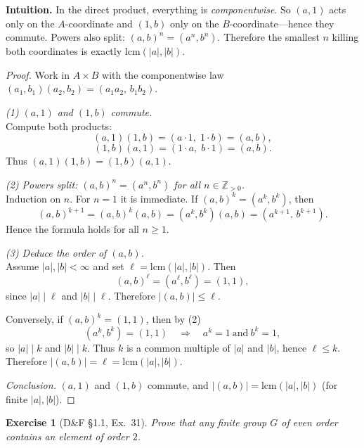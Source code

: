 \documentclass[12pt]{article}
\newtheorem{exercise}[theorem]{Exercise}
\theoremstyle{definition}
\begin{document}
\dotfill

\noindent
\textbf{Intuition.}
In the direct product, everything is \emph{componentwise}. So $(a,1)$ acts only on the $A$-coordinate and $(1,b)$ only on the $B$-coordinate—hence they commute. Powers also split: $(a,b)^n=(a^n,b^n)$. Therefore the smallest $n$ killing both coordinates is exactly $\mathrm{lcm}(|a|,|b|)$.

\dotfill

\begin{proof}
Work in $A\times B$ with the componentwise law $(a_1,b_1)(a_2,b_2)=(a_1a_2,\,b_1b_2)$.

\dotfill

\noindent\emph{(1) $(a,1)$ and $(1,b)$ commute.}\\

\noindent
Compute both products:
\[
(a,1)(1,b)=(a\cdot 1,\;1\cdot b)=(a,b),
\]
\[
(1,b)(a,1)=(1\cdot a,\;b\cdot 1)=(a,b).
\]
Thus $(a,1)(1,b)=(1,b)(a,1)$.

\dotfill

\noindent\emph{(2) Powers split: $(a,b)^n=(a^n,b^n)$ for all $n\in\mathbb{Z}_{>0}$.}\\

\noindent
Induction on $n$. For $n=1$ it is immediate. If $(a,b)^k=(a^k,b^k)$, then
\[
(a,b)^{k+1}=(a,b)^k(a,b)=(a^k,b^k)(a,b)=(a^{k+1},\,b^{k+1}).
\]
Hence the formula holds for all $n\ge 1$.

\dotfill

\noindent\emph{(3) Deduce the order of $(a,b)$.}\\

\noindent
Assume $|a|,|b|<\infty$ and set $\ell=\mathrm{lcm}(|a|,|b|)$. Then
\[
(a,b)^\ell=(a^\ell,b^\ell)=(1,1),
\]
since $|a|\mid \ell$ and $|b|\mid \ell$. Therefore $|(a,b)|\le \ell$.

Conversely, if $(a,b)^k=(1,1)$, then by (2)
\[
(a^k,b^k)=(1,1) \quad\Longrightarrow\quad a^k=1\ \text{and}\ b^k=1,
\]
so $|a|\mid k$ and $|b|\mid k$. Thus $k$ is a common multiple of $|a|$ and $|b|$, hence $\ell\le k$.
Therefore $|(a,b)|=\ell=\mathrm{lcm}(|a|,|b|)$.

\dotfill

\noindent\emph{Conclusion.}
$(a,1)$ and $(1,b)$ commute, and $|(a,b)|=\mathrm{lcm}(|a|,|b|)$ (for finite $|a|,|b|$).
\end{proof}

\newpage

\begin{exercise}[D\&F §1.1, Ex.~31]
Prove that any finite group $G$ of even order contains an element of order $2$.
\end{exercise}
\end{document}
